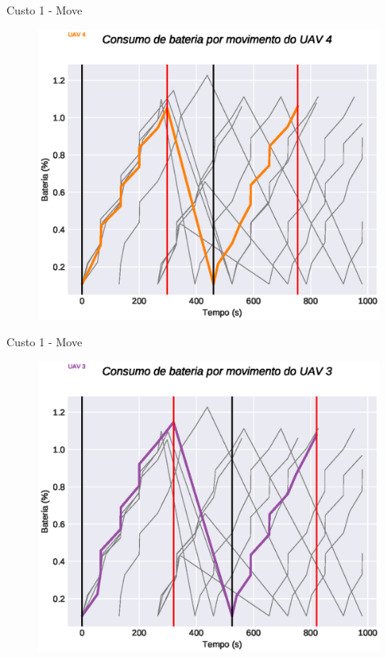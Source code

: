 \begin{frame}{Custo 1 - Move}
                \begin{figure}[!htb]
                     \includegraphics[width=\textwidth]{custo_1/uav_move_acum_uav_4.eps}
                 \end{figure}
            \end{frame}\begin{frame}{Custo 1 - Move}
                \begin{figure}[!htb]
                     \includegraphics[width=\textwidth]{custo_1/uav_move_acum_uav_3.eps}

\end{figure}
\end{frame}
